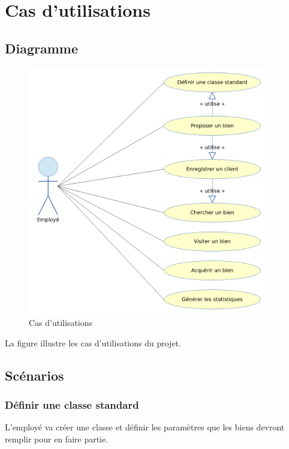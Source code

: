 \chapter{Cas d'utilisations}

\section{Diagramme}

\begin{figure}
  \centering
  \includegraphics[width=0.95\textwidth]{IMG/uc}
  \caption{Cas d'utilisations}
  \label{img_uc}
\end{figure}

La figure  illustre les cas d'utilisations du projet.

\section{Scénarios}

\subsection{Définir une classe standard}

L'employé va créer une classe et définir les paramètres que les biens devront remplir pour en faire partie.

